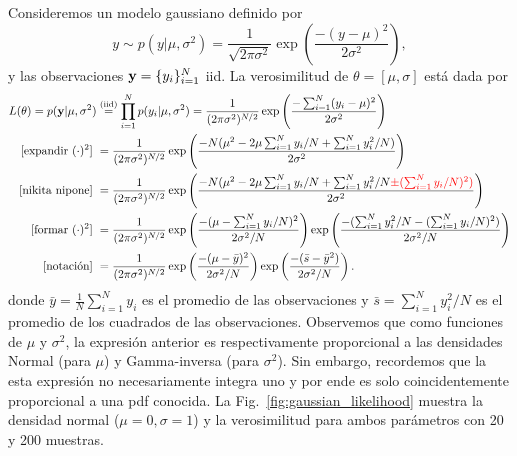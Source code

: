 \begin{mdframed}[style=ejemplo, frametitle={\center Ejemplo: Verosimilitud para el modelo gaussiano  (muestras  independientes)}]

Consideremos un  modelo gaussiano definido por 
\begin{equation}
	y \sim p(y|\mu,\sigma^2) = \frac{1}{\sqrt{2\pi\sigma^2}}\exp\left(\frac{-(y-\mu)^2}{2\sigma^2}\right),
\end{equation}
y las observaciones $\mathbf{y} = \{y_i\}_{i=1}^N$ iid. La verosimilitud  de $\theta  =  [\mu,\sigma]$ está dada por 
\begin{align}
  	L(\theta)  =  p(\mathbf{y}|\mu,\sigma^2) 
  				&\stackrel{\text{(iid)}}{=}\prod_{i=1}^N p(y_i|\mu,\sigma^2) 
  				 = \frac{1}{(2\pi\sigma^2)^{N/2}}  \exp\left(\frac{-\sum_{i=1}^N(y_i-\mu)^2}{2\sigma^2}\right)\\
  				\text{[expandir $(\cdot)^2$]}\  & = \frac{1}{(2\pi\sigma^2)^{N/2}}  \exp\left(\frac{-N(\mu^2 - 2\mu\sum_{i=1}^Ny_i/N + \sum_{i=1}^Ny_i^2/N)}{2\sigma^2}\right)\nonumber\\
  				\text{[nikita nipone]}\  & = \frac{1}{(2\pi\sigma^2)^{N/2}}  \exp\left(\frac{-N(\mu^2 - 2\mu\sum_{i=1}^Ny_i/N + \sum_{i=1}^Ny_i^2/N \textcolor{red}{ \pm (\sum_{i=1}^Ny_i/N)^2)}}{2\sigma^2}\right)\nonumber\\
  				\text{[formar $(\cdot)^2$]}\  & = \frac{1}{(2\pi\sigma^2)^{N/2}}  \exp\left(\frac{-(\mu - \sum_{i=1}^Ny_i/N)^2}{2\sigma^2/N}\right)
  				\exp\left(\frac{-(\sum_{i=1}^Ny_i^2/N  - (\sum_{i=1}^Ny_i/N)^2)}{2\sigma^2/N}\right)
  				\nonumber\\
  				\text{[notación]}\  & = \frac{1}{(2\pi\sigma^2)^{N/2}}  \exp\left(\frac{-(\mu - \bar y)^2}{2\sigma^2/N}\right)
  				\exp\left(\frac{-(\bar s  - \bar y^2)}{2\sigma^2/N}\right)
  				\nonumber.
  \end{align}  
  donde $\bar y = \tfrac{1}{N}\sum_{i=1}^Ny_i$ es el promedio de las observaciones y $\bar s = \sum_ {i=1}^Ny_i^2/N$ es el promedio de los cuadrados de las observaciones. Observemos que como funciones de $\mu$ y $\sigma^2$, la expresión anterior es respectivamente  proporcional a las densidades Normal (para $\mu$) y Gamma-inversa (para $\sigma^2$). Sin embargo, recordemos que la esta  expresión no necesariamente integra uno y por  ende es solo coincidentemente proporcional a una pdf conocida. La Fig.~\ref{fig:gaussian_likelihood} muestra la  densidad normal ($\mu=0,\sigma=1$) y la verosimilitud para ambos parámetros con 20 y 200 muestras. 


\end{mdframed}
